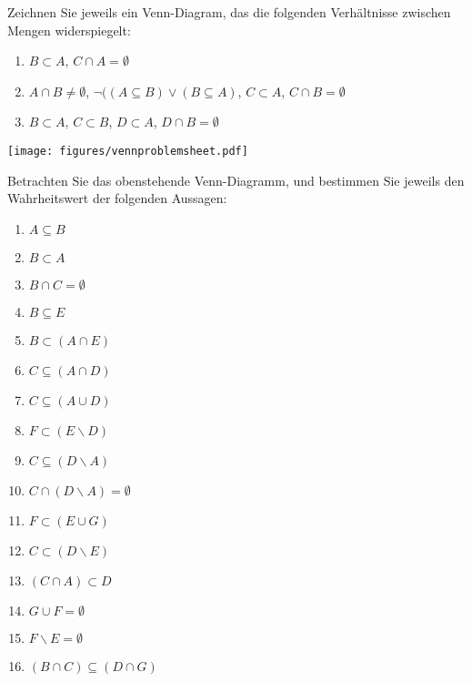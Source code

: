 
Zeichnen Sie jeweils ein Venn-Diagram, das die folgenden Verhältnisse zwischen Mengen widerspiegelt:
\begin{enumerate}
\item $B\subset A$, $C\cap A=\emptyset$
\item $A\cap B\not=\emptyset$, $\neg((A\subseteq B)\vee (B\subseteq A)$, $C\subset A$, $C\cap B=\emptyset$
\item $B\subset A$, $C\subset B$, $D\subset A$, $D\cap B=\emptyset$
\end{enumerate}




\begin{center}
\texttt{[image: figures/vennproblemsheet.pdf]}
\end{center}

Betrachten Sie das obenstehende Venn-Diagramm, und bestimmen Sie jeweils den Wahrheitswert der folgenden Aussagen:\\
\parbox{0.5\textwidth}{
\begin{enumerate}
\item $A\subseteq B$
\item $B\subset A$
\item $B\cap C=\emptyset$
\item $B\subseteq E$
\item $B\subset(A\cap E)$
\item $C\subseteq(A\cap D)$
\item $C\subseteq(A\cup D)$
\item $F\subset(E\backslash D)$
\end{enumerate}}\parbox{0.5\textwidth}{
\begin{enumerate}\setcounter{enumi}{8}
\item $C\subseteq(D\backslash A)$
\item $C\cap(D\backslash A)=\emptyset$
\item $F\subset(E\cup G)$
\item $C\subset(D\backslash E)$
\item $(C\cap A)\subset D$
\item $G\cup F=\emptyset$
\item $F\backslash E=\emptyset$
\item $(B\cap C)\subseteq (D\cap G)$
\end{enumerate}}



